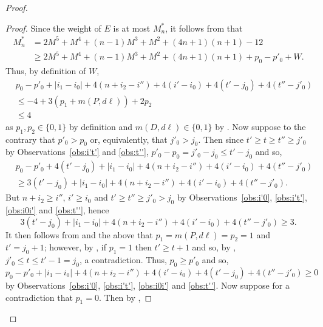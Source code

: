 \documentclass[a4paper,11pt]{article}
\theoremstyle{plain}
\newtheorem{identification rule}{Identification Rule}
\theoremstyle{definition}
\theoremstyle{remark}
\newenvironment{claimproof}{\begin{proof}\renewcommand{\qedsymbol}{\claimqed}}{\end{proof}\renewcommand{\qedsymbol}{\plainqed}}
\let\plainqed\qedsymbol
\newcommand{\claimqed}{$\lrcorner$}
\begin{document}
\begin{proof}
\begin{claimproof}
Since the weight of $E$ is at most $M_n^*$, it follows from  that
\begin{equation*}
\begin{split} 
M_n^* & = 2M^5 + M^4 + (n-1)M^3 + M^2 + (4n+1)(n+1) - 12\\
& \geq 2M^5 + M^4 + (n-1)M^3 + M^2 + (4n+1)(n+1) + p_0-p'_0 + W.
\end{split}
\end{equation*}
Thus, by definition of $W$,
\begin{equation}
\label{eq:upperbound}
\begin{split}
& p_0 - p'_0 + |i_1-i_0| + 4(n+i_2-i'') + 4(i'-i_0) + 4(t'-j_0) + 4(t''-j'_0)\\
&\leq -4 + 3(p_1 + m(P,d\ell)) + 2p_2 \\
& \leq 4
\end{split}
\end{equation}
\noindent
as $p_1,p_2 \in \{0,1\}$ by definition and $m(D,d\ell) \in \{0,1\}$ by . Now suppose to the contrary that $p'_0 > p_0$ or, equivalently, that $j'_0 > j_0$. Then since $t' \geq t \geq t'' \geq j'_0$ by Observations~\ref{obs:i't'} and \ref{obs:t''}, $p'_0 - p_0 = j'_0 - j_0 \leq t' - j_0$ and so,
\begin{equation*}
\begin{split}
& p_0 - p'_0 + 4(t'-j_0) + |i_1-i_0| + 4(n+i_2-i'') + 4(i'-i_0)+ 4(t''-j'_0)\\
&\geq 3(t'-j_0) + |i_1-i_0| + 4(n+i_2-i'') + 4(i'-i_0) + 4(t''-j'_0).
\end{split}
\end{equation*} 
But $n+i_2 \geq i''$, $i' \geq i_0$ and $t' \geq t'' \geq j'_0 > j_0$ by Observations~\ref{obs:i'0}, \ref{obs:i't'}, \ref{obs:i0i'} and \ref{obs:t''}, hence
\begin{equation*}
3(t'-j_0) + |i_1-i_0| + 4(n+i_2-i'') + 4(i'-i_0) + 4(t''-j'_0) \geq 3.
\end{equation*} 
It then follows from  and the above that $p_1 = m(P,d\ell) = p_2=1$ and $t' = j_0 + 1$; however, by , if $p_1 = 1$ then $t' \geq t+1$ and so, by , $j'_0 \leq t \leq t'-1 = j_0$, a contradiction. Thus, $p_0 \geq p'_0$ and so,
\begin{equation}
\label{eq:positif}
 p_0 - p'_0 + |i_1-i_0| + 4(n+i_2-i'') + 4(i'-i_0) + 4(t'-j_0) + 4(t''-j'_0) \geq 0
\end{equation}
\noindent 
by Observations~\ref{obs:i'0}, \ref{obs:i't'}, \ref{obs:i0i'}  and \ref{obs:t''}. Now suppose for a contradiction that $p_1=0$. Then by ,

\end{claimproof}
\end{proof}
\end{document}
